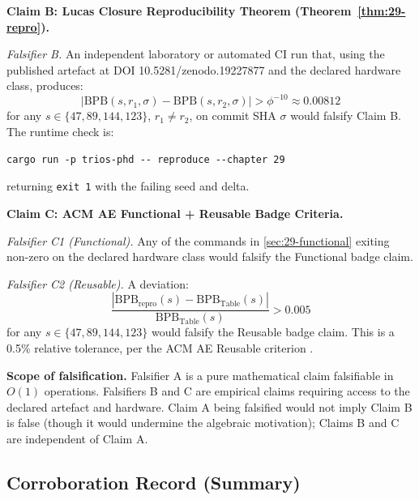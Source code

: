 \medskip\noindent
\textbf{Claim B: Lucas Closure Reproducibility Theorem (Theorem~\ref{thm:29-repro}).}

\noindent\textit{Falsifier B.}  An independent laboratory or automated
CI run that, using the published artefact at DOI 10.5281/zenodo.19227877
and the declared hardware class, produces:
\begin{equation}
  \bigl\lvert \mathrm{BPB}(s, r_1, \sigma) -
              \mathrm{BPB}(s, r_2, \sigma) \bigr\rvert
  > \phi^{-10} \approx 0.00812
  \label{eq:falsifier-b}
\end{equation}
for any $s \in \{47, 89, 144, 123\}$, $r_1 \neq r_2$, on commit SHA
$\sigma$ would falsify Claim B.  The runtime check is:
\begin{verbatim}
cargo run -p trios-phd -- reproduce --chapter 29
\end{verbatim}
returning \texttt{exit 1} with the failing seed and delta.

\medskip\noindent
\textbf{Claim C: ACM AE Functional + Reusable Badge Criteria.}

\noindent\textit{Falsifier C1 (Functional).}  Any of the commands in
\textsection\ref{sec:29-functional} exiting non-zero on the declared
hardware class would falsify the Functional badge claim.

\noindent\textit{Falsifier C2 (Reusable).}  A deviation:
\begin{equation}
  \frac{|\mathrm{BPB}_{\mathrm{repro}}(s) - \mathrm{BPB}_{\mathrm{Table}}(s)|}
       {\mathrm{BPB}_{\mathrm{Table}}(s)} > 0.005
  \label{eq:falsifier-c2}
\end{equation}
for any $s \in \{47, 89, 144, 123\}$ would falsify the Reusable badge
claim.  This is a 0.5\% relative tolerance, per the ACM AE Reusable
criterion \cite{acm_ae_policy,acm_ae_2023}.

\medskip\noindent
\textbf{Scope of falsification.}
Falsifier A is a pure mathematical claim falsifiable in $O(1)$
operations.  Falsifiers B and C are empirical claims requiring access
to the declared artefact and hardware.  Claim A being falsified would
not imply Claim B is false (though it would undermine the algebraic
motivation); Claims B and C are independent of Claim A.

\subsection{Corroboration Record (Summary)}


